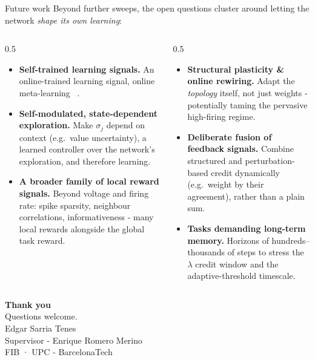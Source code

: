 \documentclass[aspectratio=169,11pt]{beamer}
\begin{document}
\begin{frame}{Future work}
  \small
  Beyond further sweeps, the open questions cluster around letting the network
  \emph{shape its own learning}:
  \vspace{0.4em}
  \begin{columns}[T]
    \begin{column}{0.5\textwidth}
      \begin{itemize}\setlength\itemsep{0.5em}
        \item \textbf{Self-trained learning signals.} An online-trained learning signal, online meta-learning
        ~\citep{OneShotEprop}.
        \item \textbf{Self-modulated, state-dependent exploration.} Make
              $\sigma_j$ depend on context (e.g.\ value uncertainty), a learned controller over the network's exploration, and therefore learning.
        \item \textbf{A broader family of local reward signals.} Beyond voltage
              and firing rate: spike sparsity, neighbour correlations,
              informativeness - many local rewards alongside the global task
              reward.
      \end{itemize}
    \end{column}
    \begin{column}{0.5\textwidth}
      \begin{itemize}\setlength\itemsep{0.5em}
        \item \textbf{Structural plasticity \& online rewiring.} Adapt the
              \emph{topology} itself, not just weights - potentially taming the
              pervasive high-firing regime.
        \item \textbf{Deliberate fusion of feedback signals.} Combine structured
              and perturbation-based credit dynamically (e.g.\ weight by their
              agreement), rather than a plain sum.
        \item \textbf{Tasks demanding long-term memory.} Horizons of hundreds–
              thousands of steps to stress the $\lambda$ credit window and the
              adaptive-threshold timescale.
      \end{itemize}
    \end{column}
  \end{columns}
\end{frame}

\begin{frame}[plain]
  \centering
  {\color{accent}\Large\textbf{Thank you}}\\[1ex]
  Questions welcome.\\[2ex]
  \small
  Edgar Sarria Tenes\\
  Supervisor - Enrique Romero Merino\\
  FIB · UPC - BarcelonaTech
\end{frame}
\end{document}
